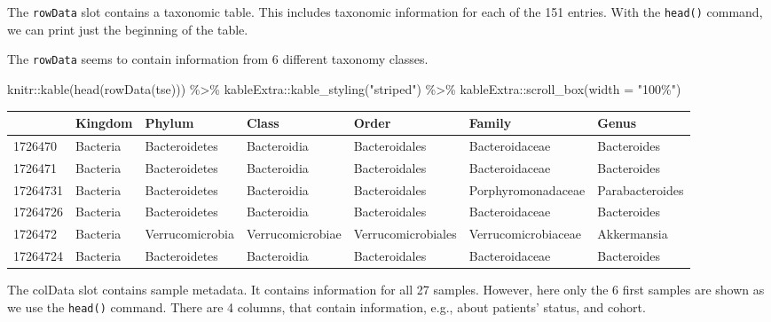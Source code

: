 \documentclass[
]{book}
\newenvironment{Shaded}{\begin{snugshade}}{\end{snugshade}}
\newcommand{\AttributeTok}[1]{\textcolor[rgb]{0.77,0.63,0.00}{#1}}
\newcommand{\FunctionTok}[1]{\textcolor[rgb]{0.00,0.00,0.00}{#1}}
\newcommand{\NormalTok}[1]{#1}
\newcommand{\SpecialCharTok}[1]{\textcolor[rgb]{0.00,0.00,0.00}{#1}}
\newcommand{\StringTok}[1]{\textcolor[rgb]{0.31,0.60,0.02}{#1}}
\begin{document}
The \texttt{rowData} slot contains a taxonomic table. This includes taxonomic
information for each of the 151 entries. With the \texttt{head()}
command, we can print just the beginning of the table.

The \texttt{rowData} seems to contain information from 6
different taxonomy classes.

\begin{Shaded}
\begin{Highlighting}[]
\NormalTok{knitr}\SpecialCharTok{::}\FunctionTok{kable}\NormalTok{(}\FunctionTok{head}\NormalTok{(}\FunctionTok{rowData}\NormalTok{(tse))) }\SpecialCharTok{\%\textgreater{}\%}\NormalTok{ kableExtra}\SpecialCharTok{::}\FunctionTok{kable\_styling}\NormalTok{(}\StringTok{"striped"}\NormalTok{) }\SpecialCharTok{\%\textgreater{}\%} 
\NormalTok{  kableExtra}\SpecialCharTok{::}\FunctionTok{scroll\_box}\NormalTok{(}\AttributeTok{width =} \StringTok{"100\%"}\NormalTok{)}
\end{Highlighting}
\end{Shaded}

\begin{table}
\centering
\begin{tabular}{l|l|l|l|l|l|l}
\hline
  & Kingdom & Phylum & Class & Order & Family & Genus\\
\hline
1726470 & Bacteria & Bacteroidetes & Bacteroidia & Bacteroidales & Bacteroidaceae & Bacteroides\\
\hline
1726471 & Bacteria & Bacteroidetes & Bacteroidia & Bacteroidales & Bacteroidaceae & Bacteroides\\
\hline
17264731 & Bacteria & Bacteroidetes & Bacteroidia & Bacteroidales & Porphyromonadaceae & Parabacteroides\\
\hline
17264726 & Bacteria & Bacteroidetes & Bacteroidia & Bacteroidales & Bacteroidaceae & Bacteroides\\
\hline
1726472 & Bacteria & Verrucomicrobia & Verrucomicrobiae & Verrucomicrobiales & Verrucomicrobiaceae & Akkermansia\\
\hline
17264724 & Bacteria & Bacteroidetes & Bacteroidia & Bacteroidales & Bacteroidaceae & Bacteroides\\
\hline
\end{tabular}
\end{table}

The colData slot contains sample metadata. It contains information for all 27 samples.
However, here only the 6 first samples are shown as we use the \texttt{head()} command. There
are 4 columns, that contain information, e.g., about patients' status, and cohort.
\end{document}
